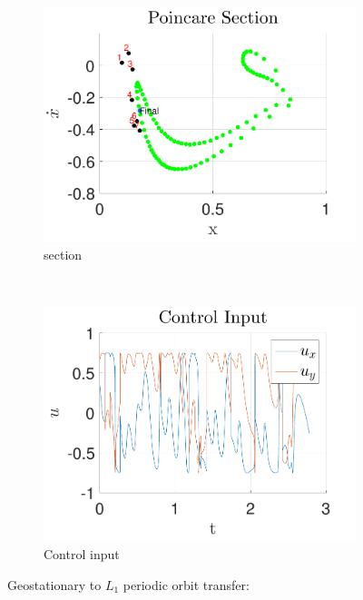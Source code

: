 \documentclass[smallcondensed]{svjour3}
\begin{document}
\begin{figure}
        \begin{subfigure}[htbp]{0.5\textwidth} 
                \includegraphics[width=\textwidth]{poincare} 
                \caption{\Poincare section} \label{fig:geo_transfer_poincare} 
        \end{subfigure}~%
        \begin{subfigure}[htbp]{0.5\textwidth} 
                \includegraphics[width=\textwidth]{control_input_geo} 
                \caption{Control input} \label{fig:control_input_geo} 
        \end{subfigure} 
        \caption{Geostationary to \( L_1 \) periodic orbit transfer: }
        \label{fig:geo_transfer} 
\end{figure}
\end{document}
